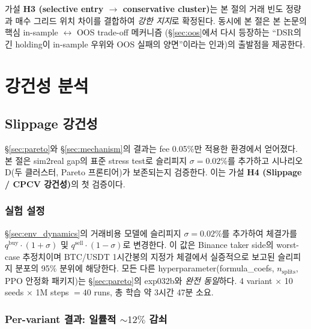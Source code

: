 \documentclass[11pt, a4paper]{article}
\begin{document}
가설 \textbf{H3 (selective entry $\to$ conservative cluster)}는 본 절의 거래 빈도
정량과 매수 그리드 위치 차이를 결합하여 \emph{강한 지지}로 확정된다. 동시에 본
절은 본 논문의 핵심 in-sample $\leftrightarrow$ OOS trade-off 메커니즘
(\S\ref{sec:oos}에서 다시 등장하는 ``DSR의 긴 holding이 in-sample 우위와 OOS
실패의 양면''이라는 인과)의 출발점을 제공한다.

\section{강건성 분석}
\label{sec:robustness}

\subsection{Slippage 강건성}
\label{sec:slippage}

\S\ref{sec:pareto}와 \S\ref{sec:mechanism}의 결과는 fee 0.05\%만 적용한
환경에서 얻어졌다. 본 절은 sim2real gap의 표준 stress test로 슬리피지
$\sigma = 0.02\%$를 추가하고 시나리오 D(두 클러스터, Pareto 프론티어)가 보존되는지
검증한다. 이는 가설 \textbf{H4 (Slippage / CPCV 강건성)}의 첫 검증이다.

\subsubsection{실험 설정}
\label{sec:slippage_setup}

\S\ref{sec:env_dynamics}의 거래비용 모델에 슬리피지 $\sigma = 0.02\%$를 추가하여
체결가를 $q^{\mathrm{buy}} \cdot (1+\sigma)$ 및 $q^{\mathrm{sell}} \cdot (1-\sigma)$로
변경한다. 이 값은 Binance taker side의 worst-case 추정치이며 BTC/USDT 1시간봉의
지정가 체결에서 실증적으로 보고된 슬리피지 분포의 95\% 분위에 해당한다. 모든
다른 hyperparameter(formula\_coefs, $n_{\text{splits}}$, PPO 안정화 패키지)는
\S\ref{sec:pareto}의 exp032b와 \emph{완전 동일}하다. 4 variant $\times$ 10 seeds
$\times$ 1M steps $= 40$ runs, 총 학습 약 3시간 47분 소요.

\subsubsection{Per-variant 결과: 일률적 $\sim 12\%$ 감쇠}
\label{sec:slippage_per_variant}
\end{document}
